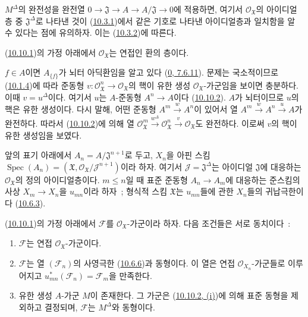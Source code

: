 $M^\Delta$의 완전성을 완전열
$0\to\mathfrak{J}\to A\to A/\mathfrak{J}\to0$에 적용하면, 여기서
$\mathscr{O}_{\mathfrak{X}}$의 아이디얼층 중
$\mathfrak{J}^\Delta$로 나타낸 것이
(\hyperref[I.10.3.1-ko]{10.3.1})에서 같은 기호로 나타낸
아이디얼층과 일치함을 알 수 있다는 점에 유의하자. 이는
(\hyperref[I.10.3.2-ko]{10.3.2})에 따른다.

\begin{proposition}[10.10.3]
\label{I.10.10.3-ko}
(\hyperref[I.10.10.1-ko]{10.10.1})의 가정 아래에서
$\mathscr{O}_{\mathfrak{X}}$는 연접인 환의 층이다.
\end{proposition}

$f\in A$이면 $A_{\{f\}}$가 뇌터 아딕환임을 알고 있다
(\hyperref[0.7.6.11-ko]{0, 7.6.11}). 문제는 국소적이므로
(\hyperref[I.10.1.4-ko]{10.1.4})에 따라 준동형
$v:\mathscr{O}_{\mathfrak{X}}^n\to\mathscr{O}_{\mathfrak{X}}$의 핵이
유한 생성 $\mathscr{O}_{\mathfrak{X}}$-가군임을 보이면 충분하다.
이때 $v=u^\Delta$이다. 여기서 $u$는 $A$-준동형 $A^n\to A$이다
(\hyperref[I.10.10.2-ko]{10.10.2}). $A$가 뇌터이므로 $u$의 핵은
유한 생성이다. 다시 말해, 어떤 준동형
$A^m\xrightarrow{w}A^n$이 있어서 열
$A^m\xrightarrow{w}A^n\xrightarrow{u}A$가 완전하다. 따라서
(\hyperref[I.10.10.2-ko]{10.10.2})에 의해 열
$\mathscr{O}_{\mathfrak{X}}^m\xrightarrow{w^\Delta}
\mathscr{O}_{\mathfrak{X}}^n\xrightarrow{v}
\mathscr{O}_{\mathfrak{X}}$도 완전하다. 이로써 $v$의 핵이 유한
생성임을 보였다.

\begin{env}[10.10.4]
\label{I.10.10.4-ko}
앞의 표기 아래에서 $A_n=A/\mathfrak{J}^{n+1}$로 두고, $X_n$을 아핀
스킴
$\operatorname{Spec}(A_n)=(\mathfrak{X},
\mathscr{O}_{\mathfrak{X}}/\mathscr{J}^{n+1})$이라 하자. 여기서
$\mathscr{J}=\mathfrak{J}^\Delta$는 아이디얼 $\mathfrak{J}$에 대응하는
$\mathscr{O}_{\mathfrak{X}}$의 정의 아이디얼층이다. $m\leq n$일 때
표준 준동형 $A_n\to A_m$에 대응하는 준스킴의 사상 $X_m\to X_n$을
$u_{mn}$이라 하자~; 형식적 스킴 $\mathfrak{X}$는 $u_{mn}$들에 관한
$X_n$들의 귀납극한이다
(\hyperref[I.10.6.3-ko]{10.6.3}).
\end{env}

\begin{proposition}[10.10.5]
\label{I.10.10.5-ko}
(\hyperref[I.10.10.1-ko]{10.10.1})의 가정 아래에서
$\mathscr{F}$를 $\mathscr{O}_{\mathfrak{X}}$-가군이라 하자. 다음 조건들은
서로 동치이다~:
\begin{enumerate}
  \item[a)] $\mathscr{F}$는 연접 $\mathscr{O}_{\mathfrak{X}}$-가군이다.
  \item[b)] $\mathscr{F}$는 열 $(\mathscr{F}_n)$의 사영극한
    (\hyperref[I.10.6.6-ko]{10.6.6})과 동형이다. 이 열은 연접
    $\mathscr{O}_{X_n}$-가군들로 이루어지고
    $u_{mn}^*(\mathscr{F}_n)=\mathscr{F}_m$을 만족한다.
  \item[c)] 유한 생성 $A$-가군 $M$이 존재한다. 그 가군은
    (\hyperref[I.10.10.2-ko]{10.10.2, (i)})에 의해 표준 동형을
    제외하고 결정되며, $\mathscr{F}$는 $M^\Delta$와 동형이다.
\end{enumerate}
\end{proposition}

